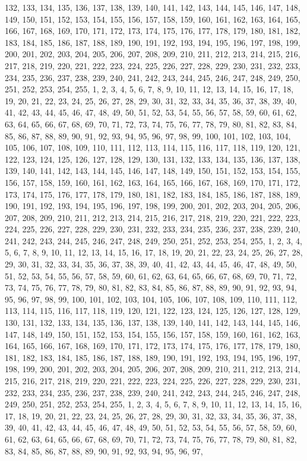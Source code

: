132, 133, 134, 135, 136, 137, 138, 139, 140, 141, 142, 143, 144, 145, 146, 147, 148, 149, 150, 151, 152, 153, 154, 155, 156, 157, 158, 159, 160, 161, 162, 163, 164, 165, 166, 167, 168, 169, 170, 171, 172, 173, 174, 175, 176, 177, 178, 179, 180, 181, 182, 183, 184, 185, 186, 187, 188, 189, 190, 191, 192, 193, 194, 195, 196, 197, 198, 199, 200, 201, 202, 203, 204, 205, 206, 207, 208, 209, 210, 211, 212, 213, 214, 215, 216, 217, 218, 219, 220, 221, 222, 223, 224, 225, 226, 227, 228, 229, 230, 231, 232, 233, 234, 235, 236, 237, 238, 239, 240, 241, 242, 243, 244, 245, 246, 247, 248, 249, 250, 251, 252, 253, 254, 255, 1, 2, 3, 4, 5, 6, 7, 8, 9, 10, 11, 12, 13, 14, 15, 16, 17, 18, 19, 20, 21, 22, 23, 24, 25, 26, 27, 28, 29, 30, 31, 32, 33, 34, 35, 36, 37, 38, 39, 40, 41, 42, 43, 44, 45, 46, 47, 48, 49, 50, 51, 52, 53, 54, 55, 56, 57, 58, 59, 60, 61, 62, 63, 64, 65, 66, 67, 68, 69, 70, 71, 72, 73, 74, 75, 76, 77, 78, 79, 80, 81, 82, 83, 84, 85, 86, 87, 88, 89, 90, 91, 92, 93, 94, 95, 96, 97, 98, 99, 100, 101, 102, 103, 104, 105, 106, 107, 108, 109, 110, 111, 112, 113, 114, 115, 116, 117, 118, 119, 120, 121, 122, 123, 124, 125, 126, 127, 128, 129, 130, 131, 132, 133, 134, 135, 136, 137, 138, 139, 140, 141, 142, 143, 144, 145, 146, 147, 148, 149, 150, 151, 152, 153, 154, 155, 156, 157, 158, 159, 160, 161, 162, 163, 164, 165, 166, 167, 168, 169, 170, 171, 172, 173, 174, 175, 176, 177, 178, 179, 180, 181, 182, 183, 184, 185, 186, 187, 188, 189, 190, 191, 192, 193, 194, 195, 196, 197, 198, 199, 200, 201, 202, 203, 204, 205, 206, 207, 208, 209, 210, 211, 212, 213, 214, 215, 216, 217, 218, 219, 220, 221, 222, 223, 224, 225, 226, 227, 228, 229, 230, 231, 232, 233, 234, 235, 236, 237, 238, 239, 240, 241, 242, 243, 244, 245, 246, 247, 248, 249, 250, 251, 252, 253, 254, 255, 1, 2, 3, 4, 5, 6, 7, 8, 9, 10, 11, 12, 13, 14, 15, 16, 17, 18, 19, 20, 21, 22, 23, 24, 25, 26, 27, 28, 29, 30, 31, 32, 33, 34, 35, 36, 37, 38, 39, 40, 41, 42, 43, 44, 45, 46, 47, 48, 49, 50, 51, 52, 53, 54, 55, 56, 57, 58, 59, 60, 61, 62, 63, 64, 65, 66, 67, 68, 69, 70, 71, 72, 73, 74, 75, 76, 77, 78, 79, 80, 81, 82, 83, 84, 85, 86, 87, 88, 89, 90, 91, 92, 93, 94, 95, 96, 97, 98, 99, 100, 101, 102, 103, 104, 105, 106, 107, 108, 109, 110, 111, 112, 113, 114, 115, 116, 117, 118, 119, 120, 121, 122, 123, 124, 125, 126, 127, 128, 129, 130, 131, 132, 133, 134, 135, 136, 137, 138, 139, 140, 141, 142, 143, 144, 145, 146, 147, 148, 149, 150, 151, 152, 153, 154, 155, 156, 157, 158, 159, 160, 161, 162, 163, 164, 165, 166, 167, 168, 169, 170, 171, 172, 173, 174, 175, 176, 177, 178, 179, 180, 181, 182, 183, 184, 185, 186, 187, 188, 189, 190, 191, 192, 193, 194, 195, 196, 197, 198, 199, 200, 201, 202, 203, 204, 205, 206, 207, 208, 209, 210, 211, 212, 213, 214, 215, 216, 217, 218, 219, 220, 221, 222, 223, 224, 225, 226, 227, 228, 229, 230, 231, 232, 233, 234, 235, 236, 237, 238, 239, 240, 241, 242, 243, 244, 245, 246, 247, 248, 249, 250, 251, 252, 253, 254, 255, 1, 2, 3, 4, 5, 6, 7, 8, 9, 10, 11, 12, 13, 14, 15, 16, 17, 18, 19, 20, 21, 22, 23, 24, 25, 26, 27, 28, 29, 30, 31, 32, 33, 34, 35, 36, 37, 38, 39, 40, 41, 42, 43, 44, 45, 46, 47, 48, 49, 50, 51, 52, 53, 54, 55, 56, 57, 58, 59, 60, 61, 62, 63, 64, 65, 66, 67, 68, 69, 70, 71, 72, 73, 74, 75, 76, 77, 78, 79, 80, 81, 82, 83, 84, 85, 86, 87, 88, 89, 90, 91, 92, 93, 94, 95, 96, 97, 